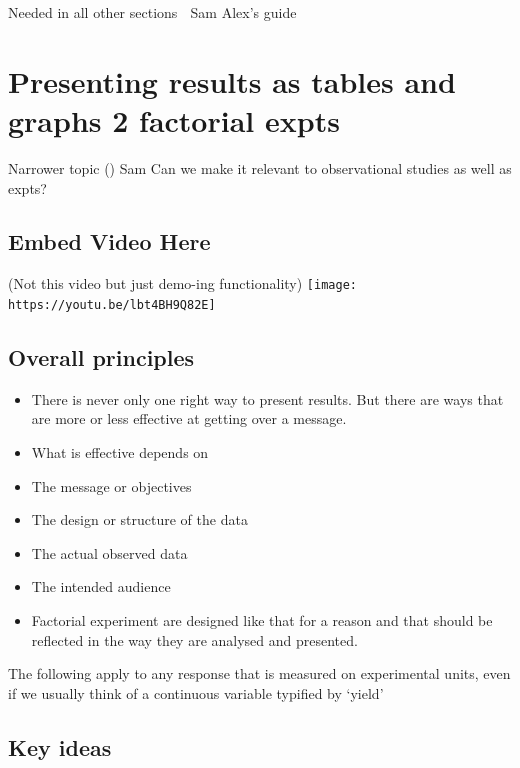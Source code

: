 \documentclass[
]{book}
\providecommand{\tightlist}{%
  \setlength{\itemsep}{0pt}\setlength{\parskip}{0pt}}
\begin{document}
Needed in all other sections 
Sam Alex's guide

\hypertarget{factor}{%
\chapter{Presenting results as tables and graphs 2 factorial expts}\label{factor}}

Narrower topic ()
Sam Can we make it relevant to observational studies as well as expts?

\hypertarget{embed-video-here}{%
\section{Embed Video Here}\label{embed-video-here}}

(Not this video but just demo-ing functionality)
\texttt{[image: https://youtu.be/lbt4BH9Q82E]}

\hypertarget{overall-principles}{%
\section{Overall principles}\label{overall-principles}}

\begin{itemize}
\tightlist
\item
  There is never only one right way to present results. But there are ways that are more or less effective at getting over a message.
\item
  What is effective depends on
\item
  The message or objectives
\item
  The design or structure of the data
\item
  The actual observed data
\item
  The intended audience
\item
  Factorial experiment are designed like that for a reason and that should be reflected in the way they are analysed and presented.
\end{itemize}

The following apply to any response that is measured on experimental units, even if we usually think of a continuous variable typified by `yield'

\hypertarget{key-ideas}{%
\section{Key ideas}\label{key-ideas}}
\end{document}
